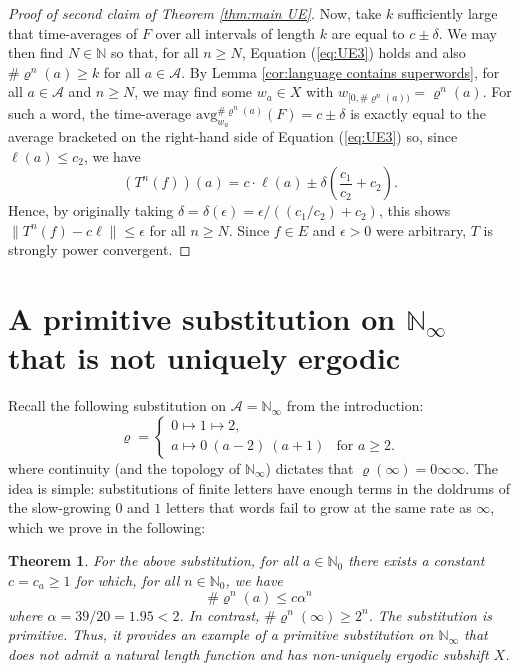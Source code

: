 \documentclass[11pt]{amsart}
\numberwithin{equation}{section}
\theoremstyle{plain}
\newtheorem{theorem}{Theorem}[section]
\theoremstyle{definition}
\newcommand{\N}{{\mathbb N}}
\newcommand{\mc}{\mathcal}
\newcommand{\A}{\mc A}
\newcommand{\sub}{\varrho}
\newcommand{\avg}{\mathrm{avg}}
\begin{document}
\begin{proof}[Proof of second claim of Theorem \ref{thm:main UE}]
Now, take \(k\) sufficiently large that time-averages of \(F\) over all intervals of length \(k\) are equal to \(c \pm \delta\). We may then find \(N \in \N\) so that, for all \(n \geq N\), Equation (\ref{eq:UE3}) holds and also \(\# \sub^n(a) \geq k\) for all \(a \in \A\). By Lemma \ref{cor:language contains superwords}, for all \(a \in \A\) and \(n \geq N\), we may find some \(w_a \in X\) with \(w_{[0,\# \sub^n(a))} = \sub^n(a)\). For such a word, the time-average \(\avg_{w_a}^{\# \sub^n(a)}(F) = c \pm \delta\) is exactly equal to the average bracketed on the right-hand side of Equation (\ref{eq:UE3}) so, since \(\ell(a) \leq c_2\), we have
\[
(T^n(f))(a) = c \cdot \ell(a) \pm \delta \left( \frac{c_1}{c_2} + c_2 \right) .
\]
Hence, by originally taking \(\delta = \delta(\epsilon) = \epsilon/((c_1/c_2)+c_2)\), this shows \(\|T^n(f) - c\ell\| \leq \epsilon\) for all \(n \geq N\). Since \(f \in E\) and \(\epsilon > 0\) were arbitrary, \(T\) is strongly power convergent.
\end{proof}

\section{A primitive substitution on \(\N_\infty\) that is not uniquely ergodic} \label{sec:non-UE}

Recall the following substitution on \(\A = \N_\infty\) from the introduction:
\[
\sub =
\begin{cases}
0 \mapsto 1 \mapsto 2 ,       & \\
a \mapsto 0 \ (a-2) \ (a+1) & \text{for } a \geq 2 .
\end{cases}
\]
where continuity (and the topology of \(\N_\infty\)) dictates that \(\sub(\infty) = 0 \infty \infty\). The idea is simple: substitutions of finite letters have enough terms in the doldrums of the slow-growing \(0\) and \(1\) letters that words fail to grow at the same rate as \(\infty\), which we prove in the following:

\begin{theorem}\label{thm:non-UE example}
For the above substitution, for all \(a \in \N_0\) there exists a constant \(c = c_a \geq 1\) for which, for all \(n \in \N_0\), we have
\[
\# \sub^n(a) \leq c \alpha^n
\]
where \(\alpha = 39/20 = 1.95 < 2\). In contrast, \(\# \sub^n(\infty) \geq 2^n\). The substitution is primitive. Thus, it provides an example of a primitive substitution on \(\N_\infty\) that does not admit a natural length function and has non-uniquely ergodic subshift \(X\).
\end{theorem}
\end{document}
